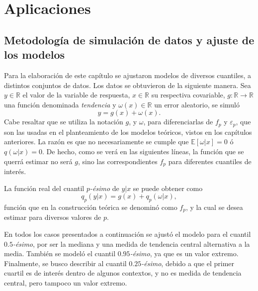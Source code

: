 \chapter[Aplicaciones]{Aplicaciones}

\section{Metodolog\'ia de simulaci\'on de datos y ajuste de los modelos}

Para la elaboraci\'on de este cap\'itulo se ajustaron modelos de diversos cuantiles, a distintos conjuntos de datos. Los datos se obtuvieron de la siguiente manera. Sea $y \in \mathbb{R}$ el valor de la variable de respuesta, $x \in \mathbb{R}$ su respectiva covariable, $g: \mathbb{R} \rightarrow \mathbb{R}$ una funci\'on denominada \textit{tendencia} y $\omega(x) \in \mathbb{R}$ un error aleatorio, se simul\'o
\begin{equation*}
    y = g(x) + \omega(x).
\end{equation*}
Cabe resaltar que se utiliza la notaci\'on $g$, y $\omega$, para diferenciarlas de $f_p$ y $\varepsilon_p$, que son las usadas en el planteamiento de los modelos te\'oricos, vistos en los cap\'itulos anteriores. La raz\'on es que no necesariamente se cumple que $\mathbb{E}[\omega|x] = 0$ \'o $q(\omega|x) = 0$. De hecho, como se ver\'a en las siguientes l\'ineas, la funci\'on que se querr\'a estimar no ser\'a $g$, sino las correspondientes $f_p$ para diferentes cuantiles de inter\'es.

La funci\'on real del cuantil $p$\textit{-\'esimo} de $y|x$ se puede obtener como
\begin{equation*}
    q_p(y|x) = g(x) + q_p(\omega|x),
\end{equation*}
funci\'on que en la construcci\'on te\'orica se denomin\'o como $f_p$, y la cual se desea estimar para diversos valores de $p$.

En todos los casos presentados a continuaci\'on se ajust\'o el modelo para el cuantil $0.5$\textit{-\'esimo}, por ser la mediana y una medida de tendencia central alternativa a la media. Tambi\'en se model\'o el cuantil $0.95$\textit{-\'esimo}, ya que es un valor extremo. Finalmente, se busco describir al cuantil $0.25$\textit{-\'esimo}, debido a que el primer cuartil es de inter\'es dentro de algunos contextos, y no es medida de tendencia central, pero tampoco un valor extremo.

